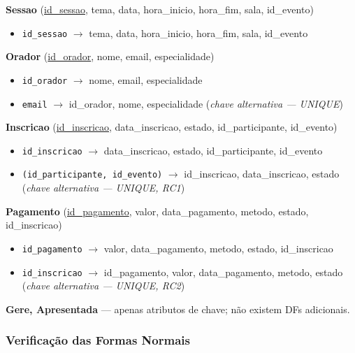 \documentclass[runningheads]{llncs}
\begin{document}
                \noindent\textbf{Sessao} (\underline{id\_sessao}, tema, data, hora\_inicio, hora\_fim, sala, id\_evento)
                \begin{itemize}
                    \item \texttt{id\_sessao} $\to$ tema, data, hora\_inicio, hora\_fim, sala, id\_evento
                \end{itemize}

                \noindent\textbf{Orador} (\underline{id\_orador}, nome, email, especialidade)
                \begin{itemize}
                    \item \texttt{id\_orador} $\to$ nome, email, especialidade
                    \item \texttt{email} $\to$ id\_orador, nome, especialidade \hfill (\textit{chave alternativa --- UNIQUE})
                \end{itemize}

                \noindent\textbf{Inscricao} (\underline{id\_inscricao}, data\_inscricao, estado, id\_participante, id\_evento)
                \begin{itemize}
                    \item \texttt{id\_inscricao} $\to$ data\_inscricao, estado, id\_participante, id\_evento
                    \item \texttt{(id\_participante, id\_evento)} $\to$ id\_inscricao, data\_inscricao, estado \hfill (\textit{chave alternativa --- UNIQUE, RC1})
                \end{itemize}

                \noindent\textbf{Pagamento} (\underline{id\_pagamento}, valor, data\_pagamento, metodo, estado, id\_inscricao)
                \begin{itemize}
                    \item \texttt{id\_pagamento} $\to$ valor, data\_pagamento, metodo, estado, id\_inscricao
                    \item \texttt{id\_inscricao} $\to$ id\_pagamento, valor, data\_pagamento, metodo, estado \hfill (\textit{chave alternativa --- UNIQUE, RC2})
                \end{itemize}

                \noindent\textbf{Gere, Apresentada} --- apenas atributos de chave; não existem DFs adicionais.

                \subsubsection{Verificação das Formas Normais}\mbox{}\\
\end{document}
